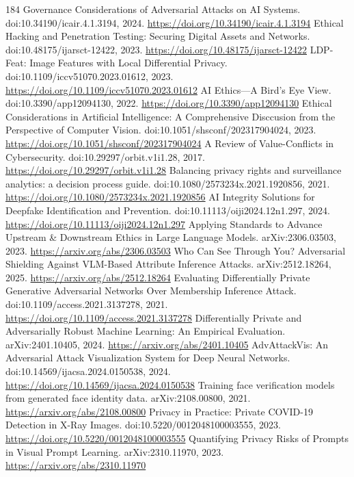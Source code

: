 \documentclass[11pt]{article}
\begin{document}
\begin{thebibliography}{184}
 Governance Considerations of Adversarial Attacks on AI Systems. doi:10.34190/icair.4.1.3194, 2024. \url{https://doi.org/10.34190/icair.4.1.3194}
 Ethical Hacking and Penetration Testing: Securing Digital Assets and Networks. doi:10.48175/ijarsct-12422, 2023. \url{https://doi.org/10.48175/ijarsct-12422}
 LDP-Feat: Image Features with Local Differential Privacy. doi:10.1109/iccv51070.2023.01612, 2023. \url{https://doi.org/10.1109/iccv51070.2023.01612}
 AI Ethics—A Bird’s Eye View. doi:10.3390/app12094130, 2022. \url{https://doi.org/10.3390/app12094130}
 Ethical Considerations in Artificial Intelligence: A Comprehensive Disccusion from the Perspective of Computer Vision. doi:10.1051/shsconf/202317904024, 2023. \url{https://doi.org/10.1051/shsconf/202317904024}
 A Review of Value-Conflicts in Cybersecurity. doi:10.29297/orbit.v1i1.28, 2017. \url{https://doi.org/10.29297/orbit.v1i1.28}
 Balancing privacy rights and surveillance analytics: a decision process guide. doi:10.1080/2573234x.2021.1920856, 2021. \url{https://doi.org/10.1080/2573234x.2021.1920856}
 AI Integrity Solutions for Deepfake Identification and Prevention. doi:10.11113/oiji2024.12n1.297, 2024. \url{https://doi.org/10.11113/oiji2024.12n1.297}
 Applying Standards to Advance Upstream \& Downstream Ethics in Large Language Models. arXiv:2306.03503, 2023. \url{https://arxiv.org/abs/2306.03503}
 Who Can See Through You? Adversarial Shielding Against VLM-Based Attribute Inference Attacks. arXiv:2512.18264, 2025. \url{https://arxiv.org/abs/2512.18264}
 Evaluating Differentially Private Generative Adversarial Networks Over Membership Inference Attack. doi:10.1109/access.2021.3137278, 2021. \url{https://doi.org/10.1109/access.2021.3137278}
 Differentially Private and Adversarially Robust Machine Learning: An Empirical Evaluation. arXiv:2401.10405, 2024. \url{https://arxiv.org/abs/2401.10405}
 AdvAttackVis: An Adversarial Attack Visualization System for Deep Neural Networks. doi:10.14569/ijacsa.2024.0150538, 2024. \url{https://doi.org/10.14569/ijacsa.2024.0150538}
 Training face verification models from generated face identity data. arXiv:2108.00800, 2021. \url{https://arxiv.org/abs/2108.00800}
 Privacy in Practice: Private COVID-19 Detection in X-Ray Images. doi:10.5220/0012048100003555, 2023. \url{https://doi.org/10.5220/0012048100003555}
 Quantifying Privacy Risks of Prompts in Visual Prompt Learning. arXiv:2310.11970, 2023. \url{https://arxiv.org/abs/2310.11970}

\end{thebibliography}
\end{document}
